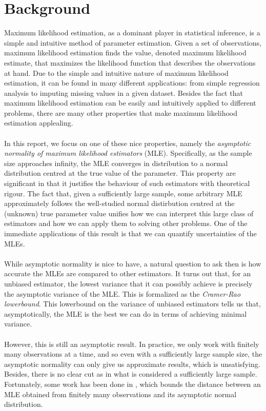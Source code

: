 

\section{Background}
Maximum likelihood estimation, as a dominant player in statistical inference, is a simple and intuitive method of parameter estimation. Given a set of \iid observations, maximum likelihood estimation finds the value, denoted maximum likelihood estimate, that maximizes the likelihood function that describes the observations at hand. Due to the simple and intuitive nature of maximum likelihood estimation, it can be found in many different applications: from simple regression analysis to imputing missing values in a given dataset. Besides the fact that maximum likelihood estimation can be easily and intuitively applied to different problems, there are many other properties that make maximum likelihood estimation applealing.\\\\
In this report, we focus on one of these nice properties, namely the \emph{asymptotic normality of maximum likelihood estimators} (MLE). Specifically, as the sample size approaches infinity, the MLE converges in distribution to a normal distribution centred at the true value of the parameter. This property are significant in that it justifies the behaviour of such estimators with theoretical rigour. The fact that, given a sufficiently large sample, some arbitrary MLE approximately follows the well-studied normal distirbution centred at the (unknown) true parameter value unifies how we can interpret this large class of estimators and how we can apply them to solving other problems. One of the immediate applications of this result is that we can quantify uncertainties of the MLEs.\\\\
While asymptotic normality is nice to have, a natural question to ask then is how accurate the MLEs are compared to other estimators. It turns out that, for an unbiased estimator, the lowest variance that it can possibly achieve is precisely the asymptotic variance of the MLE. This is formalized as the \emph{Cramer-Rao lowerbound}. This lowerbound on the variance of unbiased estimators tells us that, asymptotically, the MLE is the best we can do in terms of achieving minimal variance.\\\\
However, this is still an asymptotic result. In practice, we only work with finitely many observations at a time, and so even with a sufficiently large sample size, the asymptotic normality can only give us approximate results, which is unsatisfying. Besides, there is no clear cut as in what is considered a sufficiently large sample. Fortunately, some work has been done in \cite{anastasiou2015bounds}, which bounds the distance between an MLE obtained from finitely many observations and its asymptotic normal distribution.\\\\
